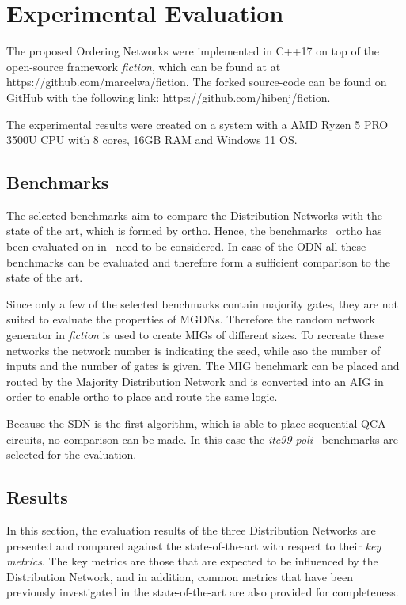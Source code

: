 \chapter{Experimental Evaluation}\label{chapter:ExpEval}

The proposed Ordering Networks were implemented in C++17 on top of the open-source framework \textit{fiction}, which can be found at at https://github.com/marcelwa/fiction. The forked source-code can be found on GitHub with the following link: https://github.com/hibenj/fiction.

The experimental results were created on a system with a AMD Ryzen 5 PRO 3500U CPU with 8 cores, 16GB RAM and Windows 11 OS.

\section{Benchmarks}
The selected benchmarks aim to compare the Distribution Networks with the state of the art, which is formed by ortho. Hence, the benchmarks~\cite{fontes, trindade2016placement, epfl, iscas} ortho has been evaluated on in~\cite{ortho} need to be considered. In case of the ODN all these benchmarks can be evaluated and therefore form a sufficient comparison to the state of the art.

Since only a few of the selected benchmarks contain majority gates, they are not suited to evaluate the properties of MGDNs. Therefore the random network generator in \textit{fiction} is used to create MIGs of different sizes. To recreate these networks the network number is indicating the seed, while aso the number of inputs and the number of gates is given. The MIG benchmark can be placed and routed by the Majority Distribution Network and is converted into an AIG in order to enable ortho to place and route the same logic.

Because the SDN is the first algorithm, which is able to place sequential QCA circuits, no comparison can be made. In this case the \textit{itc99-poli}~\cite{itc_poli} benchmarks are selected for the evaluation.

\section{Results}
In this section, the evaluation results of the three Distribution Networks are presented and compared against the state-of-the-art with respect to their \textit{key metrics}. The key metrics are those that are expected to be influenced by the Distribution Network, and in addition, common metrics that have been previously investigated in the state-of-the-art are also provided for completeness.

